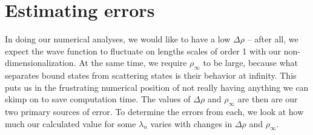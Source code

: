 \documentclass[12pt,twoside]{reedthesis}
\begin{document}
\section{Estimating errors}
In doing our numerical analyses, we would like to have a low $\Delta \rho$ -- after all, we expect the wave function to fluctuate on lengths scales of order 1 with our non-dimensionalization. At the same time, we require $\rho_{\infty}$ to be large, because what separates bound states from scattering states is their behavior at infinity. This puts us in the frustrating numerical position of not really having anything we can skimp on to save computation time. The values of $\Delta \rho$ and $\rho_\infty$ are then are our two primary sources of error. To determine the errors from each, we look at how much our calculated value for some $\lambda_{n}$ varies with changes in $\Delta \rho$ and $\rho_{\infty}$.  
\end{document}
